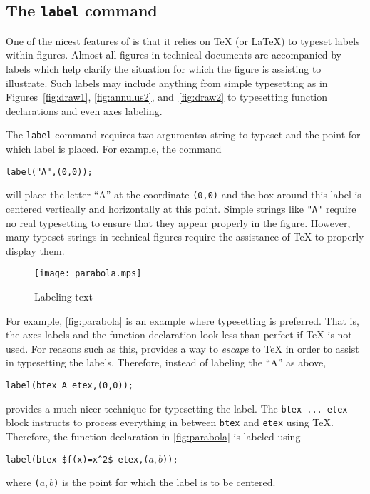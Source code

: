 \subsection{The \texttt{label} command}

One of the nicest features of \MP{} is that it relies on \TeX{} (or
\LaTeX) to typeset labels within figures.  Almost all figures in
technical documents are accompanied by labels which help clarify the
situation for which the figure is assisting to illustrate.  Such labels
may include anything from simple typesetting as in
Figures~\ref{fig:draw1}, \ref{fig:annulus2}, and~\ref{fig:draw2} to
typesetting function declarations and even axes labeling.

The \texttt{label} command requires two arguments\Dash a string to
typeset and the point for which label is placed.  For example, the
command

\begin{center}
  \verb|label("A",(0,0));|
\end{center}
will place the letter ``A'' at the coordinate \texttt{(0,0)} and the box
around this label is centered vertically and horizontally at this point.
Simple strings like \texttt{"A"} require no real typesetting to ensure
that they appear properly in the figure.  However, many typeset strings
in technical figures require the assistance of \TeX{} to properly
display them.

\begin{figure}
  \centering
  \texttt{[image: parabola.mps]}
  \caption{Labeling text}
  \label{fig:parabola}
\end{figure}

For example, \autoref{fig:parabola} is an example where typesetting is
preferred.  That is, the axes labels and the function declaration look
less than perfect if \TeX{} is not used.  For reasons such as this,
\MP{} provides a way to \textit{escape} to \TeX{} in order to assist in
typesetting the labels.  Therefore, instead of labeling the ``A'' as
above,

\begin{center}
  \verb|label(btex A etex,(0,0));|
\end{center}
provides a much nicer technique for typesetting the label.  The
\texttt{btex\,...\,etex} block instructs \MP{} to process everything in
between \texttt{btex} and \texttt{etex} using \TeX.  Therefore, the
function declaration in \autoref{fig:parabola} is labeled using

\begin{center}
  \verb|label(btex $f(x)=x^2$ etex,(|$a,b$\verb|));|
\end{center}
where \verb|(|$a,b$\verb|)| is the point for which the label is to be
centered.

